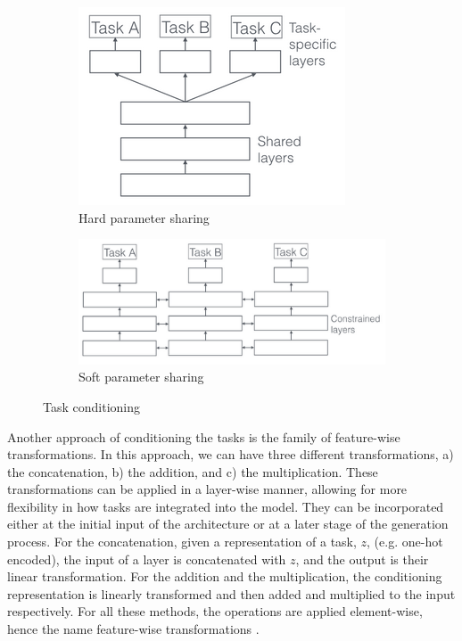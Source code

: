 \documentclass[12pt, a4paper]{article}
\begin{document}
\begin{figure}[h!]
    \centering
    \begin{subfigure}[t]{0.48\textwidth}
        \centering
        \includegraphics[width=.6\textwidth]{hard.png}
        \caption{Hard parameter sharing}
        \label{fig:hard}
    \end{subfigure}
    \hfill
    \begin{subfigure}[t]{0.48\textwidth}
        \centering
        \includegraphics[width=\textwidth]{soft.png}
        \caption{Soft parameter sharing}
        \label{fig:soft}
    \end{subfigure}
    \caption{Task conditioning \cite{ruderOverviewMultiTaskLearning2017}}
    \label{}
\end{figure}

Another approach of conditioning the tasks is the family of feature-wise transformations. In this approach, we can have three different transformations, a) the concatenation, b) the addition, and c) the multiplication. These transformations can be applied in a layer-wise manner, allowing for more flexibility in how tasks are integrated into the model. They can be incorporated either at the initial input of the architecture or at a later stage of the generation process. For the concatenation, given a representation of a task, $z$, (e.g. one-hot encoded), the input of a layer is concatenated with $z$, and the output is their linear transformation. For the addition and the multiplication, the conditioning representation is linearly transformed and then added and multiplied to the input respectively. For all these methods, the operations are applied element-wise, hence the name feature-wise transformations \cite{dumoulin2018feature-wise}.
\end{document}
